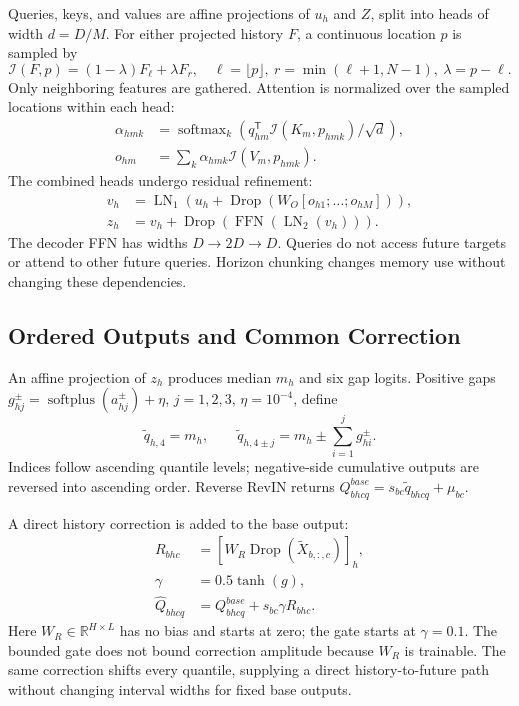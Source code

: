 Queries, keys, and values are affine projections of $u_h$ and $Z$, split into heads of width $d=D/M$. For either projected history $F$, a continuous location $p$ is sampled by
\begin{equation}
 \mathcal I(F,p)=(1-\lambda)F_\ell+\lambda F_r,\quad
 \ell=\lfloor p\rfloor,\ r=\min(\ell+1,N-1),\
 \lambda=p-\ell.
\end{equation}
Only neighboring features are gathered. Attention is normalized over the sampled locations within each head:
\begin{align}
 \alpha_{hmk}&=\operatorname{softmax}_k
 \left(q_{hm}^{\mathsf T}\mathcal I(K_m,p_{hmk})/\sqrt d\right),\\
 o_{hm}&=\sum_k\alpha_{hmk}\mathcal I(V_m,p_{hmk}).
\end{align}
The combined heads undergo residual refinement:
\begin{align}
 v_h&=\operatorname{LN}_1\!\left(u_h+\operatorname{Drop}(W_O[o_{h1};\ldots;o_{hM}])\right),\\
 z_h&=v_h+\operatorname{Drop}(\operatorname{FFN}(\operatorname{LN}_2(v_h))).
\end{align}
The decoder FFN has widths $D\rightarrow2D\rightarrow D$. Queries do not access future targets or attend to other future queries. Horizon chunking changes memory use without changing these dependencies.

\subsection{Ordered Outputs and Common Correction}
An affine projection of $z_h$ produces median $m_h$ and six gap logits. Positive gaps
$g^\pm_{hj}=\operatorname{softplus}(a^\pm_{hj})+\eta$,
$j=1,2,3$, $\eta=10^{-4}$, define
\begin{equation}
 \widetilde q_{h,4}=m_h,\qquad
 \widetilde q_{h,4\pm j}=m_h\pm\sum_{i=1}^jg^\pm_{hi}.
 \label{eq:ordering}
\end{equation}
Indices follow ascending quantile levels; negative-side cumulative outputs are reversed into ascending order. Reverse RevIN returns
$Q^{base}_{bhcq}=s_{bc}\widetilde q_{bhcq}+\mu_{bc}$.

A direct history correction is added to the base output:
\begin{equation}
 \begin{aligned}
 R_{bhc}&=[W_R\operatorname{Drop}(\widetilde X_{b,:,c})]_h,\\
 \gamma&=0.5\tanh(g),\\
 \widehat Q_{bhcq}&=Q^{base}_{bhcq}+s_{bc}\gamma R_{bhc}.
 \end{aligned}
 \label{eq:correction}
\end{equation}
Here $W_R\in\mathbb R^{H\times L}$ has no bias and starts at zero; the gate starts at $\gamma=0.1$. The bounded gate does not bound correction amplitude because $W_R$ is trainable. The same correction shifts every quantile, supplying a direct history-to-future path without changing interval widths for fixed base outputs.

